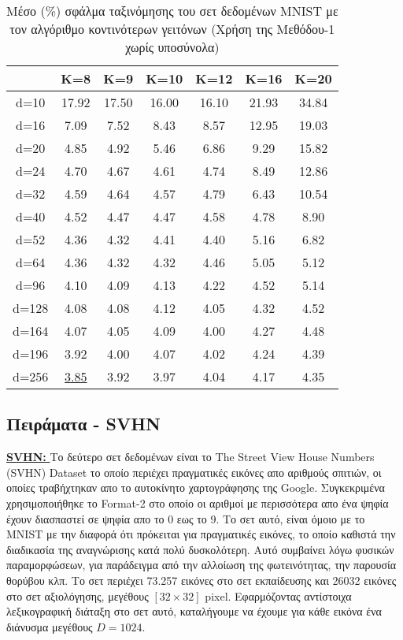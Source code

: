 \begin{table}[H]
\singlespacing
\centering
\label{tab:table10}
\caption{Μέσο (\%) σφάλμα ταξινόμησης του σετ δεδομένων \textlatin{MNIST} με τον αλγόριθμο κοντινότερων γειτόνων (Χρήση της Μεθόδου-1 χωρίς υποσύνολα)}
\vspace*{5mm}
\begin{tabular}{|c|c|c|c|c|c|c|}
\hline
& K=8 & K=9 & K=10 & K=12 & K=16 & K=20 \\
\hline
d=10 & 17.92 & 17.50 & 16.00 & 16.10 & 21.93 & 34.84 \\
d=16 & 7.09 & 7.52 & 8.43 & 8.57 & 12.95 & 19.03 \\
d=20 & 4.85 & 4.92 & 5.46 & 6.86 & 9.29 & 15.82 \\
d=24 & 4.70 & 4.67 & 4.61 & 4.74 & 8.49 & 12.86 \\
d=32 & 4.59 & 4.64 & 4.57 & 4.79 & 6.43 & 10.54 \\
d=40 & 4.52 & 4.47 & 4.47 & 4.58 & 4.78 & 8.90 \\
d=52 & 4.36 & 4.32 & 4.41 & 4.40 & 5.16 & 6.82 \\
d=64 & 4.36 & 4.32 & 4.32 & 4.46 & 5.05 & 5.12 \\
d=96 & 4.10 & 4.09 & 4.13 & 4.22 & 4.52 & 5.14 \\
d=128 & 4.08 & 4.08 & 4.12 & 4.05 & 4.32 & 4.52 \\
d=164 & 4.07 & 4.05 & 4.09 & 4.00 & 4.27 & 4.48 \\
d=196 & 3.92 & 4.00 & 4.07 & 4.02 & 4.24 & 4.39 \\
d=256 & \underline{3.85} & 3.92 & 3.97 & 4.04 & 4.17 & 4.35 \\
\hline
\end{tabular}
\end{table}

\subsection{Πειράματα - \textlatin{SVHN}}
\par
\href{http://ufldl.stanford.edu/housenumbers/}{\textbf{\textlatin{SVHN: }}}Το δεύτερο σετ δεδομένων είναι το \textlatin{The Street View House Numbers (SVHN) Dataset}\cite{12} το οποίο περιέχει πραγματικές εικόνες απο αριθμούς σπιτιών, οι οποίες τραβήχτηκαν απο το αυτοκίνητο χαρτογράφησης της \textlatin{Google}. Συγκεκριμένα χρησιμοποιήθηκε το \textlatin{Format-2} στο οποίο οι αριθμοί με περισσότερα απο ένα ψηφία έχουν διασπαστεί σε ψηφία απο το 0 εως το 9. Το σετ αυτό, είναι όμοιο με το \textlatin{MNIST}\textlatin{\cite{mnist}} με την διαφορά ότι πρόκειται για πραγματικές εικόνες, το οποίο καθιστά την διαδικασία της αναγνώρισης κατά πολύ δυσκολότερη. Αυτό συμβαίνει λόγω φυσικών παραμορφώσεων, για παράδειγμα από την αλλοίωση της φωτεινότητας, την παρουσία θορύβου κλπ. Το σετ περιέχει 73.257 εικόνες στο σετ εκπαίδευσης και 26032 εικόνες στο σετ αξιολόγησης, μεγέθους $[32 \times 32]$ \textlatin{pixel}. Εφαρμόζοντας αντίστοιχα λεξικογραφική διάταξη στο σετ αυτό, καταλήγουμε να έχουμε για κάθε εικόνα ένα διάνυσμα μεγέθους $D = 1024$. 

